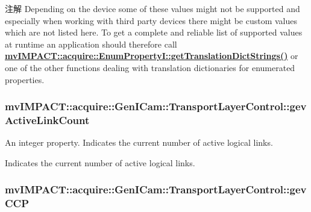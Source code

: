 \begin{DoxyNote}{注解}
Depending on the device some of these values might not be supported and especially when working with third party devices there might be custom values which are not listed here. To get a complete and reliable list of supported values at runtime an application should therefore call {\bfseries \hyperlink{classmv_i_m_p_a_c_t_1_1acquire_1_1_enum_property_i_a0ba6ccbf5ee69784d5d0b537924d26b6}{mv\+I\+M\+P\+A\+C\+T\+::acquire\+::\+Enum\+Property\+I\+::get\+Translation\+Dict\+Strings()}} or one of the other functions dealing with translation dictionaries for enumerated properties. 
\end{DoxyNote}
\hypertarget{classmv_i_m_p_a_c_t_1_1acquire_1_1_gen_i_cam_1_1_transport_layer_control_a1809ad4c80d86c2e1a271b2b699bd58d}{
\subsubsection[{gev\+Active\+Link\+Count}]{ mv\+I\+M\+P\+A\+C\+T\+::acquire\+::\+Gen\+I\+Cam\+::\+Transport\+Layer\+Control\+::gev\+Active\+Link\+Count}}\label{classmv_i_m_p_a_c_t_1_1acquire_1_1_gen_i_cam_1_1_transport_layer_control_a1809ad4c80d86c2e1a271b2b699bd58d}


An integer property. Indicates the current number of active logical links. 

Indicates the current number of active logical links. \hypertarget{classmv_i_m_p_a_c_t_1_1acquire_1_1_gen_i_cam_1_1_transport_layer_control_aaba3d3751e5771b738ed06ebb9800871}{
\subsubsection[{gev\+C\+C\+P}]{ mv\+I\+M\+P\+A\+C\+T\+::acquire\+::\+Gen\+I\+Cam\+::\+Transport\+Layer\+Control\+::gev\+C\+C\+P}}\label{classmv_i_m_p_a_c_t_1_1acquire_1_1_gen_i_cam_1_1_transport_layer_control_aaba3d3751e5771b738ed06ebb9800871}


